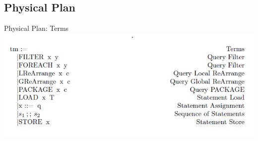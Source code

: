 \subsection{Physical Plan}

\begin{frame}{Physical Plan: Terms}
\centering
\includegraphics[scale=0.6]{Images/Grammar/Terms_Physical.JPG}
\end{frame}

